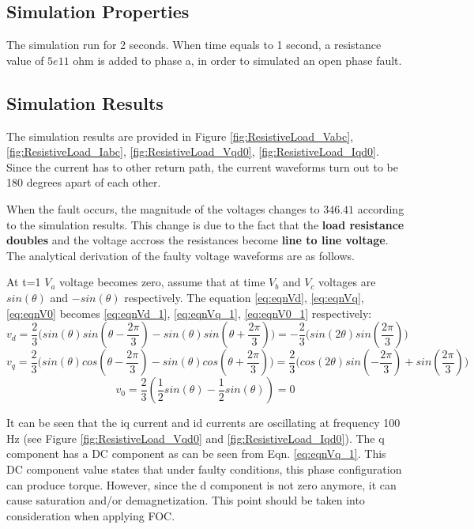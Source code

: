 \documentclass{article}
\begin{document}
\subsection{Simulation Properties}
The simulation run for 2 seconds. When time equals to 1 second, a resistance value of $5e11$  ohm is added to phase a, in order to simulated an open phase fault.

\subsection{Simulation Results}
The simulation results are provided in Figure \ref{fig:ResistiveLoad_Vabc}, \ref{fig:ResistiveLoad_Iabc}, \ref{fig:ResistiveLoad_Vqd0}, \ref{fig:ResistiveLoad_Iqd0}. Since the current has to other return path, the current waveforms turn out to be 180 degrees apart of each other. 

When the fault occurs, the magnitude of the voltages changes to $346.41$ according to the simulation results. This change is due to the fact that the \textbf{load resistance doubles} and the voltage accross the resistances become \textbf{line to line voltage}. 
The analytical derivation of the faulty voltage waveforms are as follows. 


At t=1 $V_a$ voltage becomes zero, assume that at time $V_b$ and $V_c$ voltages are $sin(\theta)$ and $-sin(\theta)$ respectively. The equation \ref{eq:eqnVd}, \ref{eq:eqnVq},  \ref{eq:eqnV0} becomes \ref{eq:eqnVd_1}, \ref{eq:eqnVq_1},  \ref{eq:eqnV0_1} respectively:
\begin{equation} \label{eq:eqnVd_1}
    v_d = \frac{2}{3}\Bigg(sin(\theta)sin(\theta-\frac{2\pi}{3}) - sin(\theta)sin(\theta+\frac{2\pi}{3})\Bigg) =  -\frac{2}{3}\Bigg(sin(2\theta)sin(\frac{2\pi}{3})\Bigg)
\end{equation}
\begin{equation} \label{eq:eqnVq_1}
v_q = \frac{2}{3}\Bigg(sin(\theta)cos(\theta-\frac{2\pi}{3}) - sin(\theta)cos(\theta+\frac{2\pi}{3})\Bigg) =  \frac{2}{3}\Bigg(cos(2\theta)sin(-\frac{2\pi}{3})+sin(\frac{2\pi}{3})\Bigg)
\end{equation}
\begin{equation} \label{eq:eqnV0_1}
 v_0 = \frac{2}{3}(\frac{1}{2}sin(\theta)-\frac{1}{2}sin(\theta)) = 0
\end{equation}

It can be seen that the iq current and id currents are oscillating at frequency 100 Hz (see Figure \ref{fig:ResistiveLoad_Vqd0} and \ref{fig:ResistiveLoad_Iqd0}). The q component has a DC component as can be seen from Eqn. \ref{eq:eqnVq_1}. This DC component value states that under faulty conditions, this phase configuration can produce torque. However, since the d component is not zero anymore, it can cause saturation and/or demagnetization. This point should be taken into consideration when applying FOC.
\end{document}
